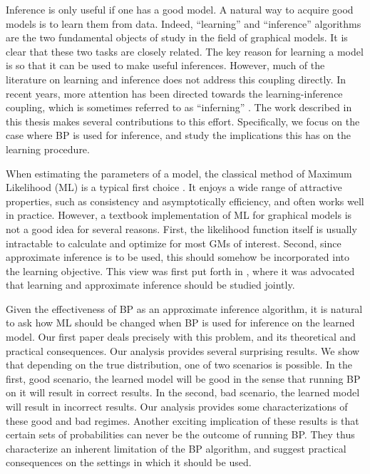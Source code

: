 Inference is only useful if one has a good model.
A natural way to acquire good models is to learn them from data. Indeed, ``learning'' and ``inference'' algorithms are the two fundamental objects of study in the field of graphical models.
It is clear that these two tasks are closely related.
The key reason for learning a model is so that it can
be used to make useful inferences. However, much of the literature on learning and inference does not address this coupling directly.
In recent years, more attention has been directed towards the learning-inference coupling, which is sometimes referred to as ``inferning'' \cite{inferning_cite}.
The work described in this thesis makes several contributions to this effort.
Specifically, we focus on the case where BP is used for inference, and study the implications this has on the learning procedure.

When estimating the parameters of a model, the classical method of Maximum Likelihood (ML) is a typical first choice \cite{degroot1986probability}.
It enjoys a wide range of attractive properties, such as consistency and asymptotically efficiency, and often works well in practice. However, a textbook implementation of ML for graphical models is not a good idea for several reasons. First, the likelihood function itself is usually intractable to calculate and optimize for most GMs of interest. Second, since approximate inference is to be used, this should somehow be incorporated into the learning objective. This view was first put forth in  \cite{wainwright2006estimating}, where it was advocated that learning and approximate inference should be studied jointly.  
 
Given the effectiveness of BP as an approximate inference algorithm, it is natural to ask how ML should be changed when BP is used for inference on the learned model. Our first paper  \cite{heinemann2012cannot} deals precisely with this problem, and its theoretical and practical consequences. Our analysis provides several surprising results. We show that depending on the true distribution, one of two scenarios is possible. In the first, good scenario, the learned model will be good in the sense that running BP on it will result in correct results. In the second, bad scenario, the learned model will result in incorrect results. Our analysis provides some characterizations of these good and bad regimes. Another exciting implication of these results is that certain sets of probabilities can never be the outcome of running BP. They thus characterize an inherent limitation of the BP algorithm, and suggest practical consequences on the settings in which it should be used.  

